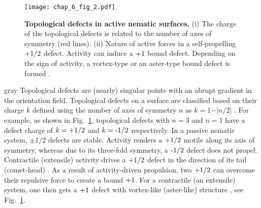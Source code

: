 \begin{figure}
	\centering
	\texttt{[image: chap\_6\_fig\_2.pdf]}
	\caption{ \textbf{Topological defects in active nematic surfaces.} (i) The charge of the topological defects is related to the number of axes of symmetry (red lines). (ii) Nature of active forces in a self-propelling $\textup{+} 1/2$ defect. Activity can induce a $\textup{+}1$ bound defect. Depending on the sign of activity, a vortex-type  or an aster-type bound defect is formed .}
	\label{fig_0_2}
\end{figure}
\begin{center}
	\begin{mybox}{gray}{}
		Topological defects  are (nearly) singular points with an abrupt gradient in the orientation field. Topological defects on a surface are classified based on their charge $k$ defined using the number of axes of symmetry $n$ as $k = 1 - \vert n/2\vert$ \cite{tang2017}.
		For example, as shown in Fig.~\ref{fig_0_2}, topological defects with $n=3$ and $n=1$ have a defect charge  of $k= \textup{+} 1/2$ and $k=\textup{-} 1/2$ respectively. In a passive nematic system, $\pm 1/2$ defects are stable. Activity renders a $\textup{+}1/2$ motile along its axis of symmetry, whereas due to its three-fold symmetry, a $\textup{-}1/2$ defect does not propel. Contractile (extensile) activity drives a $\textup{+}1/2$ defect in the direction of its tail (comet-head) \cite{thijssen2020,vafa2020}. As a result of activity-driven propulsion, two $\textup{+}1/2$ can overcome their repulsive force to create a bound $\textup{+}1$. For a contractile (an extensile) system, one then gets a $\textup{+}1$ defect with vortex-like (aster-like) structure \cite{thijssen2020, vafa2020}, see Fig.~\ref{fig_0_2}.
	\end{mybox}
\end{center}

